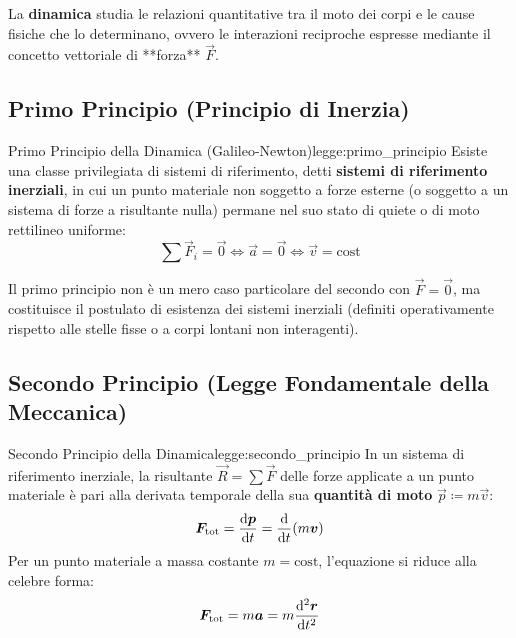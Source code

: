 La \textbf{dinamica} studia le relazioni quantitative tra il moto dei corpi e le cause fisiche che lo determinano, ovvero le interazioni reciproche espresse mediante il concetto vettoriale di **forza** $\vec{F}$.

\subsection{Primo Principio (Principio di Inerzia)}

\begin{legge}{Primo Principio della Dinamica (Galileo-Newton)}{legge:primo_principio}
Esiste una classe privilegiata di sistemi di riferimento, detti \textbf{sistemi di riferimento inerziali}, in cui un punto materiale non soggetto a forze esterne (o soggetto a un sistema di forze a risultante nulla) permane nel suo stato di quiete o di moto rettilineo uniforme:
\begin{equation}
    \sum \vec{F}_i = \vec{0} \iff \vec{a} = \vec{0} \iff \vec{v} = \text{cost}
\end{equation}
\end{legge}

\begin{osservazione}
Il primo principio non è un mero caso particolare del secondo con $\vec{F}=\vec{0}$, ma costituisce il postulato di esistenza dei sistemi inerziali (definiti operativamente rispetto alle stelle fisse o a corpi lontani non interagenti).
\end{osservazione}

\subsection{Secondo Principio (Legge Fondamentale della Meccanica)}

\begin{legge}{Secondo Principio della Dinamica}{legge:secondo_principio}
In un sistema di riferimento inerziale, la risultante $\vec{R} = \sum \vec{F}$ delle forze applicate a un punto materiale è pari alla derivata temporale della sua \textbf{quantità di moto} $\vec{p} \coloneqq m\vec{v}$:
\begin{equation}
    \bm{F}_{\text{tot}} = \frac{\mathrm{d} \bm{p}}{\mathrm{d} t} = \frac{\mathrm{d} }{\mathrm{d} t}(m\bm{v})
    \label{eq:secondo_principio_gen}
\end{equation}
Per un punto materiale a massa costante $m = \text{cost}$, l'equazione si riduce alla celebre forma:
\begin{equation}
    \bm{F}_{\text{tot}} = m\bm{a} = m\frac{\mathrm{d}^2 \bm{r}}{\mathrm{d} t^2}
    \label{eq:f_ma}
\end{equation}
\end{legge}

